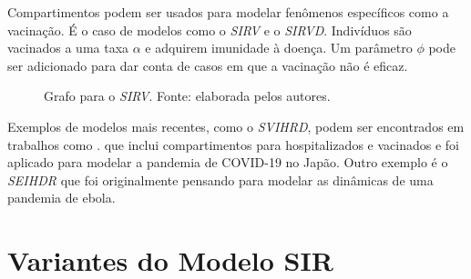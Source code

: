Compartimentos podem ser usados para modelar fenômenos específicos como a vacinação.
É o caso de modelos como o \textit{SIRV} \cite{schlickeiser-kroger:21-sirv} 
e o \textit{SIRVD}. Indivíduos são vacinados a uma taxa $\alpha$ e adquirem imunidade
à doença. Um parâmetro $\phi$ pode ser adicionado para dar conta de casos em que
a vacinação não é eficaz. 

\begin{figure}[H]
\centering
{}
\caption{Grafo para o \textit{SIRV}. Fonte: elaborada pelos autores.}
\label{fig:sirv-grafo}
\end{figure}

Exemplos de modelos mais recentes, como o \textit{SVIHRD}, podem ser encontrados
em trabalhos como \cite{nelson-etal:24-japao}.
que inclui compartimentos para hospitalizados e vacinados e foi aplicado para 
modelar a pandemia de COVID-19 no Japão. Outro exemplo é o \textit{SEIHDR} 
\cite{legrand-etal:2007-seihfr-ebola} que foi originalmente pensando para modelar
as dinâmicas de uma pandemia de ebola.

\section{Variantes do Modelo SIR}

